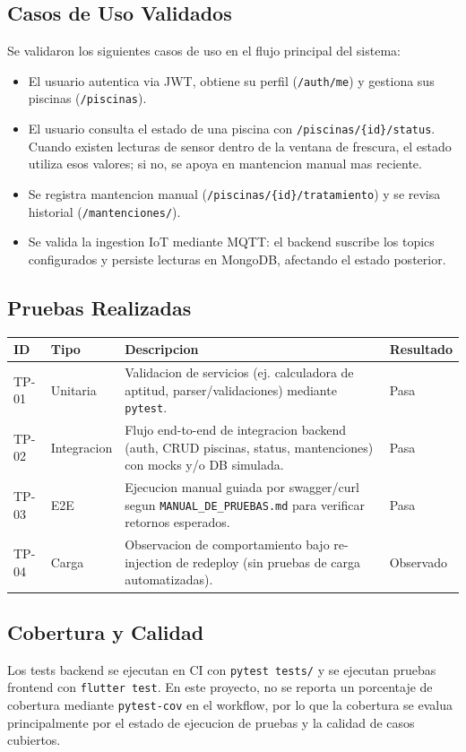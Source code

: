 \documentclass[11pt, a4paper]{article}
\begin{document}
\subsection{Casos de Uso Validados}
Se validaron los siguientes casos de uso en el flujo principal del sistema:
\begin{itemize}
  \item El usuario autentica via JWT, obtiene su perfil (\texttt{/auth/me}) y gestiona sus piscinas (\texttt{/piscinas}).
  \item El usuario consulta el estado de una piscina con \texttt{/piscinas/\{id\}/status}. Cuando existen lecturas de sensor dentro de la ventana de frescura, el estado utiliza esos valores; si no, se apoya en mantencion manual mas reciente.
  \item Se registra mantencion manual (\texttt{/piscinas/\{id\}/tratamiento}) y se revisa historial (\texttt{/mantenciones/}).
  \item Se valida la ingestion IoT mediante MQTT: el backend suscribe los topics configurados y persiste lecturas en MongoDB, afectando el estado posterior.
\end{itemize}

\subsection{Pruebas Realizadas}
\begin{longtable}{@{} p{1cm} p{2.8cm} p{10.3cm} p{2cm} @{}}
  \toprule
  \textbf{ID} & \textbf{Tipo} & \textbf{Descripcion} & \textbf{Resultado} \\
  \midrule
  TP-01 & Unitaria & Validacion de servicios (ej. calculadora de aptitud, parser/validaciones) mediante \texttt{pytest}. & Pasa \\
  \midrule
  TP-02 & Integracion & Flujo end-to-end de integracion backend (auth, CRUD piscinas, status, mantenciones) con mocks y/o DB simulada. & Pasa \\
  \midrule
  TP-03 & E2E & Ejecucion manual guiada por swagger/curl segun \texttt{MANUAL\_DE\_PRUEBAS.md} para verificar retornos esperados. & Pasa \\
  \midrule
  TP-04 & Carga & Observacion de comportamiento bajo re-injection de redeploy (sin pruebas de carga automatizadas). & Observado \\
  \bottomrule
\end{longtable}

\subsection{Cobertura y Calidad}
Los tests backend se ejecutan en CI con \texttt{pytest tests/} y se ejecutan pruebas frontend con \texttt{flutter test}. En este proyecto, no se reporta un porcentaje de cobertura mediante \texttt{pytest-cov} en el workflow, por lo que la cobertura se evalua principalmente por el estado de ejecucion de pruebas y la calidad de casos cubiertos.
\end{document}
